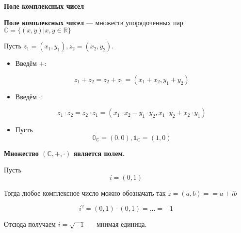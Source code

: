 \down

\down

\begin{center}
{\bf Поле комплексных чисел}
\end{center}

{\bf Поле комплексных чисел} --- множеств упорядоченных пар $\mathbb{C} = \{(x, y) | x, y \in \mathbb{R}\}$


Пусть $z_1 = (x_1, y_1), z_2 = (x_2, y_2)$.

\begin{itemize}

\item Введём $+$: 

$$z_1 + z_2 = z_2 + z_1 = (x_1 + x_2, y_1 + y_2)$$

\item Введём $\cdot$:

$$z_1 \cdot z_2  = z_2 \cdot z_1  = (x_1 \cdot x_2 - y_1 \cdot y_2, x_1 \cdot y_2 + x_2 \cdot y_1)$$

\item Пусть $$\mathbb{0}_{\mathbb{C}} = (0, 0), \mathbb{1}_{\mathbb{C}} = (1, 0)$$

\end{itemize}

{\bf Множество $(\mathbb{C},+,\cdot)$ является полем.}

Пусть $$i = (0, 1)$$

Тогда любое комплексное число можно обозначать так $z = (a, b) == a + ib$

$$i ^ 2 = (0, 1) \cdot (0, 1) = \dots = -1$$

Отсюда получаем $i = \sqrt{-1}$ --- мнимая единица.



\pagebreak